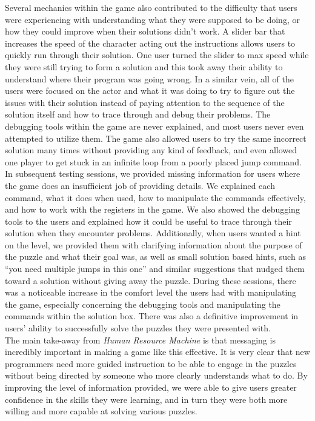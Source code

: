 Several mechanics within the game also contributed to the difficulty that users were 
experiencing with understanding what they were supposed to be doing, or how 
they could improve when their solutions didn’t work. A slider bar that increases the 
speed of the character acting out the instructions allows users to quickly run through 
their solution. One user turned the slider to max speed while they were still trying to 
form a solution and this took away their ability to understand where their program was 
going wrong. In a similar vein, all of the users were focused on the actor and what it was 
doing to try to figure out the issues with their solution instead of paying attention to the 
sequence of the solution itself and how to trace through and debug their problems. The 
debugging tools within the game are never explained, and most users never even 
attempted to utilize them. The game also allowed users to try the same incorrect solution 
many times without providing any kind of feedback, and even allowed one player to 
get stuck in an infinite loop from a poorly placed jump command.\\

In subsequent testing sessions, we provided missing information for users where the 
game does an insufficient job of providing details. We explained each command, 
what it does when used, how to manipulate the commands effectively, and how to 
work with the registers in the game. We also showed the debugging tools to the users 
and explained how it could be useful to trace through their solution when they encounter 
problems. Additionally, when users wanted a hint on the level, we provided them with 
clarifying information about the purpose of the puzzle and what their goal was, as well 
as small solution based hints, such as “you need multiple jumps in this one” and similar 
suggestions that nudged them toward a solution without giving away the puzzle. During 
these sessions, there was a noticeable increase in the comfort level the users had with 
manipulating the game, especially concerning the debugging tools and manipulating the 
commands within the solution box. There was also a definitive improvement in users’ 
ability to successfully solve the puzzles they were presented with.\\

The main take-away from \textit{Human Resource Machine} is that messaging is incredibly 
important in making a game like this effective. It is very clear that new programmers need 
more guided instruction to be able to engage in the puzzles without being directed by 
someone who more clearly understands what to do. By improving the level of information 
provided, we were able to give users greater confidence in the skills they were learning, 
and in turn they were both more willing and more capable at solving various puzzles.\\

